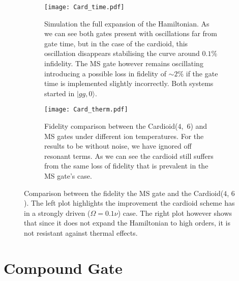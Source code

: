\documentclass[12pt,twoside]{report}
\begin{document}
\begin{figure}[t!]
	\centering
	\begin{subfigure}[t]{0.475\textwidth}
		\centering
		\texttt{[image: Card\_time.pdf]}
		\caption{Simulation the full expansion of the Hamiltonian. As we can see both gates present with oscillations far from gate time, but in the case of the cardioid, this oscillation disappears stabilising the curve around $0.1\%$ infidelity. The MS gate however remains oscillating introducing a possible loss in fidelity of $\sim 2\%$ if the gate time is implemented slightly incorrectly. Both systems started in $|gg,0\rangle$.}
		\label{fig:cardioid:full}
	\end{subfigure}
	\hfill
	\begin{subfigure}[t]{0.475\textwidth}
		\centering
		\texttt{[image: Card\_therm.pdf]}
		\caption{Fidelity comparison between the \mbox{Cardioid($4$, $6$)} and MS gates under different ion temperatures. For the results to be without noise, we have ignored off resonant terms. As we can see the cardioid still suffers from the same loss of fidelity that is prevalent in the MS gate's case.}
		\label{fig:cardioid:therm}
	\end{subfigure}
	\caption[Cardioid gate comparison]{Comparison between the fidelity the MS gate and the Cardioid($4$, $6$). The left plot highlights the improvement the cardioid scheme has in a strongly driven ($\Omega = 0.1\nu$) case. The right plot however shows that since it does not expand the Hamiltonian to high orders, it is not resistant against thermal effects.}
	\label{fig:cardioid}
\end{figure}

\section{Compound Gate}
\label{Driving_schemes:Compound}
\end{document}
